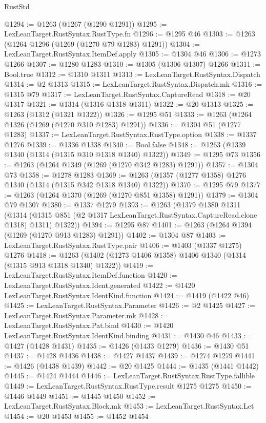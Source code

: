 \begin{lexlean}{RustStd}
\begin{coremodule}
@1294 := @1263 (@1267 (@1290 @1291))
@1295 := LexLeanTarget.RustSyntax.RustType.fn
@1296 := @1295 @46
@1303 := @1263 (@1264 @1296 (@1269 (@1270 @79 @1283) @1291))
@1304 := LexLeanTarget.RustSyntax.ItemDef.apply
@1305 := @1304 @46
@1306 := @1273 @1266
@1307 := @1280 @1283
@1310 := @1305 (@1306 @1307) @1266
@1311 := Bool.true
@1312 := @1310 @1311
@1313 := LexLeanTarget.RustSyntax.Dispatch
@1314 := @2 @1313
@1315 := LexLeanTarget.RustSyntax.Dispatch.mk
@1316 := @1315 @79
@1317 := LexLeanTarget.RustSyntax.CaptureRead
@1318 := @20 @1317
@1321 := @1314 (@1316 @1318 @1311)
@1322 := @20 @1313
@1325 := @1263 (@1312 (@1321 @1322))
@1326 := @1295 @51
@1333 := @1263 (@1264 @1326 (@1269 (@1270 @310 @1283) @1291))
@1336 := @1304 @51 (@1277 @1283)
@1337 := LexLeanTarget.RustSyntax.RustType.option
@1338 := @1337 @1276
@1339 := @1336 @1338
@1340 := Bool.false
@1348 := @1263 (@1339 @1340 (@1314 (@1315 @310 @1318 @1340) @1322))
@1349 := @1295 @73
@1356 := @1263 (@1264 @1349 (@1269 (@1270 @342 @1283) @1291))
@1357 := @1304 @73
@1358 := @1278 @1283
@1369 := @1263 (@1357 (@1277 @1358) @1276 @1340 (@1314 (@1315 @342 @1318 @1340) @1322))
@1370 := @1295 @79
@1377 := @1263 (@1264 @1370 (@1269 (@1270 @851 @1358) @1291))
@1379 := @1304 @79 @1307
@1380 := @1337 @1279
@1393 := @1263
    (@1379
      @1380
      @1311
      (@1314 (@1315 @851 (@2 @1317 LexLeanTarget.RustSyntax.CaptureRead.clone @1318) @1311) @1322))
@1394 := @1295 @87
@1401 := @1263 (@1264 @1394 (@1269 (@1270 @913 @1283) @1291))
@1402 := @1304 @87
@1403 := LexLeanTarget.RustSyntax.RustType.pair
@1406 := @1403 (@1337 @1275) @1276
@1418 := @1263 (@1402 (@1273 @1406 @1358) @1406 @1340 (@1314 (@1315 @913 @1318 @1340) @1322))
@1419 := LexLeanTarget.RustSyntax.ItemDef.function
@1420 := LexLeanTarget.RustSyntax.Ident.generated
@1422 := @1420 LexLeanTarget.RustSyntax.IdentKind.function
@1424 := @1419 (@1422 @46)
@1425 := LexLeanTarget.RustSyntax.Parameter
@1426 := @2 @1425
@1427 := LexLeanTarget.RustSyntax.Parameter.mk
@1428 := LexLeanTarget.RustSyntax.Pat.bind
@1430 := @1420 LexLeanTarget.RustSyntax.IdentKind.binding
@1431 := @1430 @46
@1433 := @1427 (@1428 @1431)
@1435 := @1426 (@1433 @1279)
@1436 := @1430 @51
@1437 := @1428 @1436
@1438 := @1427 @1437
@1439 := @1274 @1279
@1441 := @1426 (@1438 @1439)
@1442 := @20 @1425
@1444 := @1435 (@1441 @1442)
@1445 := @1424 @1444
@1446 := LexLeanTarget.RustSyntax.RustType.fallible
@1449 := LexLeanTarget.RustSyntax.RustType.result @1275 @1275
@1450 := @1446 @1449
@1451 := @1445 @1450
@1452 := LexLeanTarget.RustSyntax.Block.mk
@1453 := LexLeanTarget.RustSyntax.Let
@1454 := @20 @1453
@1455 := @1452 @1454

\end{coremodule}
\end{lexlean}
